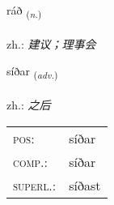\documentclass[frontgrid, backgrid]{flacards}\usepackage[]{graphicx}\usepackage[]{xcolor}
\begin{document}
\renewcommand{\blhead}{\vskip5pt {\small\bfseries\footnotesize Nafnorð | 名词 }}
\renewcommand{\bcfoot}{\vskip5pt \hspace{2pt}{\small\bfseries\footnotesize 1K}}


{ráð \small{\textsubscript{(\textit{n.})}} \\[1ex] %
\textphonetic{[rauːð]} \\
zh.: \emph{建议；理事会} \\  [2ex]
\renewcommand*{\arraystretch}{0.8}
}

\renewcommand{\flhead}{\vskip5pt \fboxsep=0pt {\small\bfseries\footnotesize Atviksorð | 副词}}
\renewcommand{\fcfoot}{\vskip5pt \fboxsep=0pt \hspace{2pt}{\small\bfseries\footnotesize 1K}}

\renewcommand{\blhead}{\vskip5pt {\small\bfseries\footnotesize Atviksorð | 副词 }}
\renewcommand{\bcfoot}{\vskip5pt \hspace{2pt}{\small\bfseries\footnotesize 1K}}


{síðar \small{\textsubscript{(\textit{adv.})}} \\[1ex] %
\textphonetic{[siːðar]} \\
zh.: \emph{之后} \\  [2ex]
\renewcommand*{\arraystretch}{0.8}
\begin{tabular}{ll}
\textsc{pos}: & síðar \\ 
\textsc{comp.}: & síðar \\ 
\textsc{superl.}: & síðast \\
\end{tabular}
}

\renewcommand{\flhead}{\vskip5pt \fboxsep=0pt {\small\bfseries\footnotesize Sagnorð | 动词}}
\renewcommand{\fcfoot}{\vskip5pt \fboxsep=0pt \hspace{2pt}{\small\bfseries\footnotesize 1K}}
\end{document}
